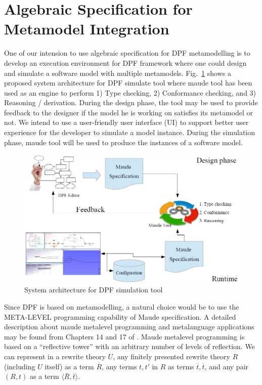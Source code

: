 \documentclass{eceasst}
\begin{document}
 
\section{Algebraic Specification for Metamodel Integration}
One of our intension to use algebraic specification for DPF metamodelling is to develop an execution environment for DPF framework where one could design and simulate a software model with 
multiple metamodels. Fig.~\ref{fig:dpfmaude} shows a proposed system architecture for DPF simulate tool where maude tool has been used as an engine to perform 1) Type checking, 2) Conformance checking,
and 3) Reasoning / derivation. During the design phase, the tool may be used to provide feedback to the designer if the model he is working on satisfies its metamodel or not. 
We intend to use a user-friendly user interface (UI) to support better user experience for the developer to simulate a model instance. 
During the simulation phase, maude tool will be used to produce the instances of a software model. 



 
 \begin{figure}[h]
\centering
 \includegraphics[width=\textwidth]{dpfmaude.png}
 \caption{System architecture for DPF simulation tool}
 \label{fig:dpfmaude}
 \end{figure}

Since DPF is based on metamodelling, a natural choice would be to use the META-LEVEL programming capability of Maude specification. 
A detailed description about maude metalevel programming and metalanguage applications may be found from Chapters 14 and 17 of \cite{Clavel2007}. 
Maude metalevel programming is based on a ``reflective tower'' with an arbitrary number of levels of reflection. 
We can represent in a rewrite theory $U$, any finitely presented rewrite theory $R$ (including $U$ itself) as a term $\overline{R}$, any terms $t, t'$ in $R$ as terms $\overline{t}, \overline{t}$, 
and any pair $(R, t)$ as a term $\langle \overline{R}, \overline{t} \rangle$. 
\end{document}
